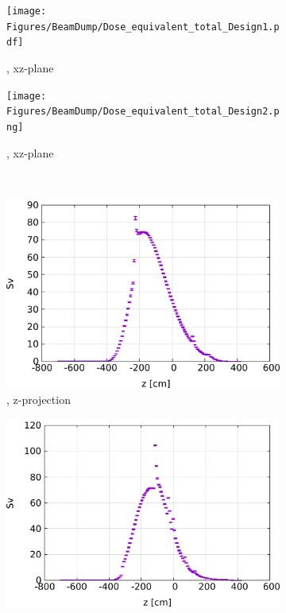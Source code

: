 \begin{figure}[!h]
 \centering
  \begin{subfigure}[b]{0.49\textwidth}
   \centering
    \texttt{[image: Figures/BeamDump/Dose\_equivalent\_total\_Design1.pdf]}
   \caption{\designone, xz-plane}
   \end{subfigure}
   \hfill
    \begin{subfigure}[b]{0.49\textwidth}
   \centering
    \texttt{[image: Figures/BeamDump/Dose\_equivalent\_total\_Design2.png]}
   \caption{\designtwo, xz-plane}
   \end{subfigure}\\ \vspace*{0.3cm}
     \begin{subfigure}[b]{0.485\textwidth}
   \centering
    \includegraphics[height=0.24\textheight]{Figures/BeamDump/Dose_equivalent_total_1DMax_z_Design1.png}
   \caption{\designone, z-projection}
   \end{subfigure}
   \hfill
    \begin{subfigure}[b]{0.485\textwidth}
   \centering
    \includegraphics[height=0.24\textheight]{Figures/BeamDump/Dose_equivalent_total_1DMax_z_Design2.png}

\end{subfigure}
\end{figure}
